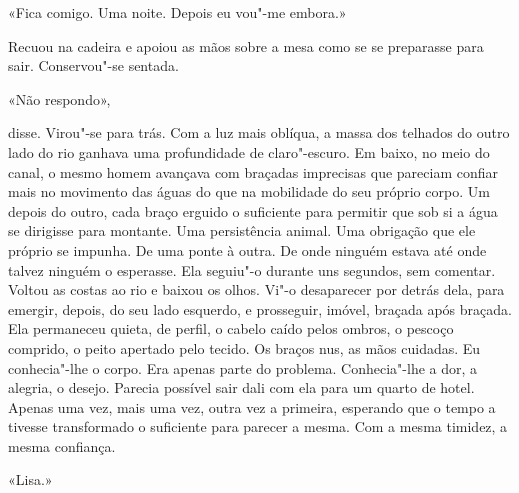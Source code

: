 «Fica comigo. Uma noite. Depois eu vou"-me embora.»

Recuou na cadeira e apoiou as mãos sobre a mesa como se se preparasse
para sair. Conservou"-se sentada.

«Não respondo»,

disse. Virou"-se para trás. Com a luz mais oblíqua, a massa dos telhados
do outro lado do rio ganhava uma profundidade de claro"-escuro. Em
baixo, no meio do canal, o mesmo homem avançava com braçadas imprecisas
que pareciam confiar mais no movimento das águas do que na mobilidade do
seu próprio corpo. Um depois do outro, cada braço erguido o suficiente
para permitir que sob si a água se dirigisse para montante. Uma
persistência animal. Uma obrigação que ele próprio se impunha. De uma
ponte à outra. De onde ninguém estava até onde talvez ninguém o
esperasse. Ela seguiu"-o durante uns segundos, sem comentar. Voltou as
costas ao rio e baixou os olhos. Vi"-o desaparecer por detrás dela, para
emergir, depois, do seu lado esquerdo, e prosseguir, imóvel, braçada
após braçada. Ela permaneceu quieta, de perfil, o cabelo caído pelos
ombros, o pescoço comprido, o peito apertado pelo tecido. Os braços nus,
as mãos cuidadas. Eu conhecia"-lhe o corpo. Era apenas parte do
problema. Conhecia"-lhe a dor, a alegria, o desejo. Parecia possível
sair dali com ela para um quarto de hotel. Apenas uma vez, mais uma vez,
outra vez a primeira, esperando que o tempo a tivesse transformado o
suficiente para parecer a mesma. Com a mesma timidez, a mesma confiança.

«Lisa.»

